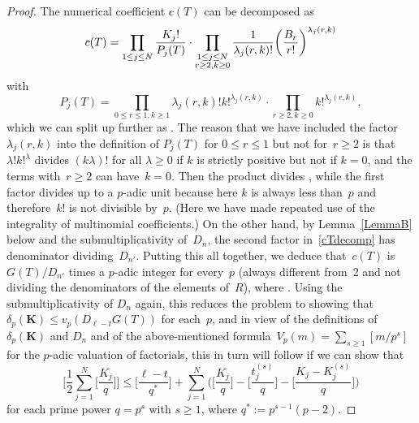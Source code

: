 \documentclass[pdftex]{sigma}
\numberwithin{equation}{section}
\def\l{\lambda}
\def\l{\lambda}
\def\m{ - }
\def\l{\lambda}
\def\be{\begin{equation}}
\def\ee{\end{equation}}
\def\bK{\mathbf K}
\begin{document}
\begin{proof}
The numerical coefficient $c(T)$ can be decomposed as
\be
\label{cTdecomp}
c(T) = \prod_{1\le j\le N}\frac{K_j!}{P_j(T)} \cdot
\prod_{\substack{1\le j\le N \\ r\ge2, k\ge0\substack}}
\frac1{\l_j(r,k)!} \biggl(\frac{B_r}{r!}\biggr)^{\l_j(r,k)}
\ee
with
\[
P_j(T) = \prod_{0\le r\le1, k\ge1}\l_j(r,k)! k!^{\l_j(r,k)} \cdot
\prod_{r\ge2, k\ge0}k!^{\l_j(r,k)} ,
\]
which we can split up further as .
The reason that we have included the factor $\l_j(r,k)$ into the definition of
$P_j(T)$ for $0\le r\le1$ but not for~$r\ge2$ is that~$\l!k!^\l$ divides $(k\l)!$
for all $\l\ge0$ if $k$ is strictly positive but not if $k=0$, and the terms with~${r\ge2}$ can have~$k=0$. Then the product 
divides , while the first factor  divides 
up to a $p$-adic unit because here $k$ is always less than~$p$ and therefore~$k!$
is not divisible by~$p$. (Here we have made repeated use of the integrality of
multinomial coefficients.) On the other hand, by Lemma~\ref{LemmaB} below
and the submultiplicativity of~$D_n$, the second factor in~\eqref{cTdecomp} has
denominator dividing~$D_{n'}$. Putting this all together, we deduce that~$c(T)$
is $G(T)/D_{n'}$ times a $p$-adic integer for every~$p$ (always different from~2
and not dividing the denominators of the elements of~$R$), where
. Using the
submultiplicativity of $D_n$ again, this reduces the problem to showing that
${\delta_p(\bK)\le v_p(D_{\ell-t} G(T))}$ for each~$p$, and in view of
the definitions of $\delta_p(\bK)$ and $D_n$ and of the above-mentioned formula~${V_p(m)=\sum_{s\ge1}[m/p^s]}$ for the $p$-adic valuation of factorials, this in turn
will follow if we can show that
\be
\label{Final}
\Biggl[\frac12\sum_{j=1}^N\biggl[\frac{K_j}q\biggr]\Biggr] \le
\biggl[\frac{\ell-t}{q^*}\biggr]
+ \sum_{j=1}^N \Bigg(\biggl[\frac{K_j}q\biggr] \m \Bigg[\frac{t_j^{(s)}}q\Bigg]
\m \Bigg[\frac{K_j-K_j^{(s)}}q\Bigg] \Bigg)
\ee
for each prime power $q=p^s$ with $s\ge1$, where $q^*:=p^{s-1}(p-2)$. %


\end{proof}
\end{document}
